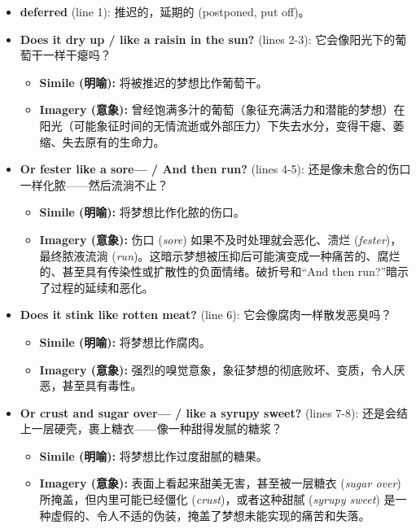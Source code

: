 \documentclass[12pt, a4paper]{article}
\begin{document}
\begin{itemize}
    \item \textbf{deferred} (line 1): 推迟的，延期的 (postponed, put off)。
    \item \textbf{Does it dry up / like a raisin in the sun?} (lines 2-3): 它会像阳光下的葡萄干一样干瘪吗？
        \begin{itemize}
            \item \textbf{Simile (明喻):} 将被推迟的梦想比作葡萄干。
            \item \textbf{Imagery (意象):} 曾经饱满多汁的葡萄（象征充满活力和潜能的梦想）在阳光（可能象征时间的无情流逝或外部压力）下失去水分，变得干瘪、萎缩、失去原有的生命力。
        \end{itemize}
    \item \textbf{Or fester like a sore— / And then run?} (lines 4-5): 还是像未愈合的伤口一样化脓——然后流淌不止？
        \begin{itemize}
            \item \textbf{Simile (明喻):} 将梦想比作化脓的伤口。
            \item \textbf{Imagery (意象):} 伤口 (\textit{sore}) 如果不及时处理就会恶化、溃烂 (\textit{fester})，最终脓液流淌 (\textit{run})。这暗示梦想被压抑后可能演变成一种痛苦的、腐烂的、甚至具有传染性或扩散性的负面情绪。破折号和“And then run?”暗示了过程的延续和恶化。
        \end{itemize}
    \item \textbf{Does it stink like rotten meat?} (line 6): 它会像腐肉一样散发恶臭吗？
        \begin{itemize}
            \item \textbf{Simile (明喻):} 将梦想比作腐肉。
            \item \textbf{Imagery (意象):} 强烈的嗅觉意象，象征梦想的彻底败坏、变质，令人厌恶，甚至具有毒性。
        \end{itemize}
    \item \textbf{Or crust and sugar over— / like a syrupy sweet?} (lines 7-8): 还是会结上一层硬壳，裹上糖衣——像一种甜得发腻的糖浆？
        \begin{itemize}
            \item \textbf{Simile (明喻):} 将梦想比作过度甜腻的糖果。
            \item \textbf{Imagery (意象):} 表面上看起来甜美无害，甚至被一层糖衣 (\textit{sugar over}) 所掩盖，但内里可能已经僵化 (\textit{crust})，或者这种甜腻 (\textit{syrupy sweet}) 是一种虚假的、令人不适的伪装，掩盖了梦想未能实现的痛苦和失落。

\end{itemize}
\end{itemize}
\end{document}
